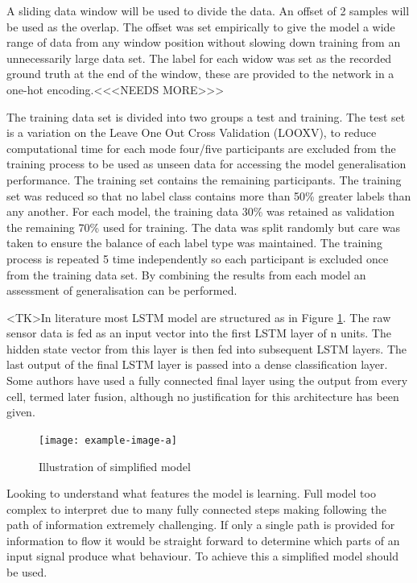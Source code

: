 \documentclass[sensors,article,submit,moreauthors,pdftex]{Definitions/mdpi}
\begin{document}
A sliding data window will be used to divide the data. An offset of 2 samples will be used as the overlap. The offset was set empirically to give the model a wide range of data from any window position without slowing down training from an unnecessarily large data set. The label for each widow was set as the recorded ground truth at the end of the window, these are provided to the network in a one-hot encoding.<<<NEEDS MORE>>>

The training data set is divided into two groups a test and training. The test set is a variation on the Leave One Out Cross Validation (LOOXV), to reduce computational time for each mode four/five participants are excluded from the training process to be used as unseen data for accessing the model generalisation performance. The training set contains the remaining participants. The training set was reduced so that no label class contains more than 50\% greater labels than any another. For each model, the training data 30\% was retained as validation the remaining 70\% used for training. The data was split randomly but care was taken to ensure the balance of each label type was maintained. The training process is repeated 5 time independently so each participant is excluded once from the training data set. By combining the results from each model an assessment of generalisation can be performed.

<TK>In literature most LSTM model are structured as in Figure \ref{fig:full_lstm_model}. The raw sensor data is fed as an input vector into the first LSTM layer of n units. The hidden state vector from this layer is then fed into subsequent LSTM layers. The last output of the final LSTM layer is passed into a dense classification layer. Some authors have used a fully connected final layer using the output from every cell, termed later fusion, although no justification for this architecture has been given.

\begin{figure}[!htb]
    \centering
    \texttt{[image: example-image-a]}
    \caption{Illustration of simplified model}
    \label{fig:full_lstm_model}
\end{figure}

Looking to understand what features the model is learning. Full model too complex to interpret due to many fully connected steps making following the path of information extremely challenging. If only a single path is provided for information to flow it would be straight forward to determine which parts of an input signal produce what behaviour. To achieve this a simplified model should be used.
\end{document}
